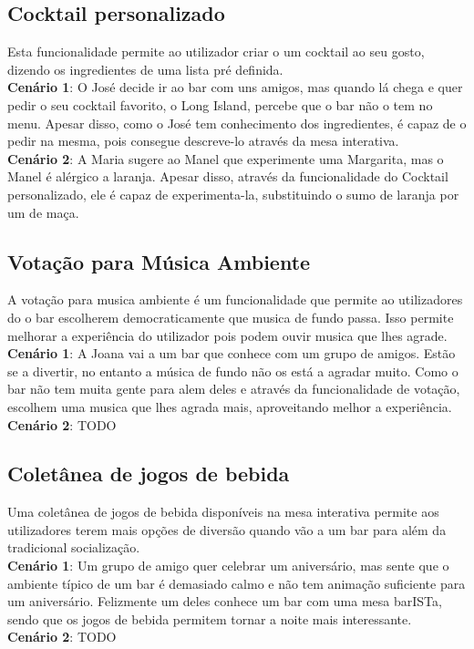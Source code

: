 \documentclass{article}
\begin{document}
\subsection*{Cocktail personalizado}
Esta funcionalidade permite ao utilizador criar o um cocktail ao seu gosto, dizendo os ingredientes de uma lista pré definida.\\
\textbf{Cenário 1}: O José decide ir ao bar com uns amigos, mas quando lá chega e quer pedir o seu cocktail favorito, o Long Island, percebe que o bar não o tem no menu. Apesar disso, como o José tem conhecimento dos ingredientes, é capaz de o pedir na mesma, pois consegue descreve-lo através da mesa interativa.\\
\textbf{Cenário 2}: A Maria sugere ao Manel que experimente uma Margarita, mas o Manel é alérgico a laranja. Apesar disso, através da funcionalidade do Cocktail personalizado, ele é capaz de experimenta-la, substituindo o sumo de laranja por um de maça.
\\

\subsection*{Votação para Música Ambiente}
A votação para musica ambiente é um funcionalidade que permite ao utilizadores do o bar escolherem democraticamente que musica de fundo passa. Isso permite melhorar a experiência do utilizador pois podem ouvir musica que lhes agrade.\\
\textbf{Cenário 1}: A Joana vai a um bar que conhece com um grupo de amigos. Estão se a divertir, no entanto a música de fundo não os está a agradar muito. Como o bar não tem muita gente para alem deles e através da funcionalidade de votação, escolhem uma musica que lhes agrada mais, aproveitando melhor a experiência.\\
\textbf{Cenário 2}: TODO

\subsection*{Coletânea de jogos de bebida}
Uma coletânea de jogos de bebida disponíveis na mesa interativa permite aos utilizadores terem mais opções de diversão quando vão a um bar para além da tradicional socialização.\\
\textbf{Cenário 1}: Um grupo de amigo quer celebrar um aniversário, mas sente que o ambiente típico de um bar é demasiado calmo e não tem animação suficiente para um aniversário. Felizmente um deles conhece um bar com uma mesa barISTa, sendo que os jogos de bebida permitem tornar a noite mais interessante.\\
\textbf{Cenário 2}: TODO
\end{document}
